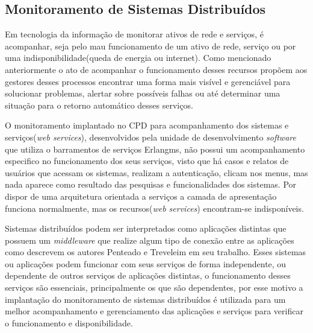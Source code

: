 
\subsection{Monitoramento de Sistemas Distribuídos}

Em tecnologia da informação de monitorar ativos de rede e serviços, é acompanhar, seja pelo mau funcionamento de um ativo de rede, serviço ou por uma indisponibilidade(queda de energia ou internet). Como mencionado anteriormente o ato de acompanhar o funcionamento desses recursos propõem aos gestores desses processos encontrar uma forma mais visível e gerenciável para solucionar problemas, alertar sobre possíveis falhas ou até determinar uma situação para o retorno automático desses serviços. 


O monitoramento implantado no \acrshort{CPD} para acompanhamento dos sistemas e serviços(\textit{web services}), desenvolvidos pela unidade de desenvolvimento \textit{software} que utiliza o barramentos de serviços Erlangms, não possui um acompanhamento especifico no funcionamento dos seus serviços, visto que há casos e relatos de usuários que acessam os sistemas, realizam a autenticação, clicam nos menus, mas nada aparece como resultado das pesquisas e funcionalidades dos sistemas. Por dispor de uma arquitetura orientada a serviços a camada de apresentação funciona normalmente, mas os recursos(\textit{web services}) encontram-se indisponíveis.

Sistemas distribuídos podem ser interpretados como aplicações distintas que possuem um \textit{middleware} que realize algum tipo de conexão entre as aplicações como descrevem os autores Penteado e Treveleim \cite{penteado2012jmonitor} em seu trabalho. Esses sistemas ou aplicações podem funcionar com seus serviços de forma independente, ou dependente de outros serviços de aplicações distintas, o funcionamento desses serviços são essenciais, principalmente os que são dependentes, por esse motivo a implantação do monitoramento de sistemas distribuídos é utilizada para um melhor acompanhamento e gerenciamento das aplicações e serviços para verificar o funcionamento e disponibilidade.   

